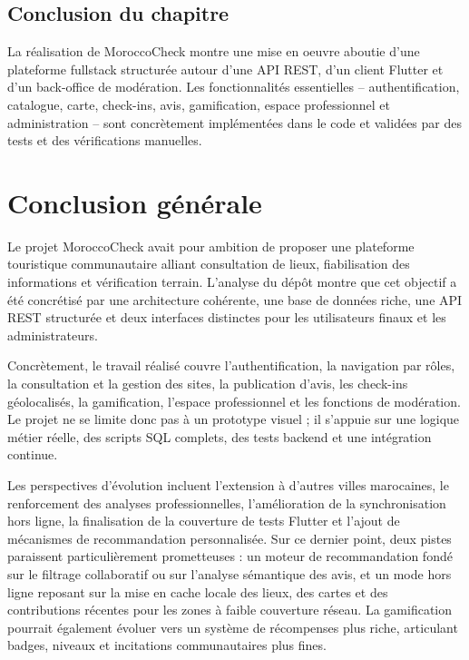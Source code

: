 ﻿\documentclass[12pt,a4paper]{report}
\begin{document}
\section{Conclusion du chapitre}
La r\'ealisation de MoroccoCheck montre une mise en oeuvre aboutie d'une plateforme fullstack structur\'ee autour d'une API REST, d'un client Flutter et d'un back-office de mod\'eration. Les fonctionnalit\'es essentielles -- authentification, catalogue, carte, check-ins, avis, gamification, espace professionnel et administration -- sont concr\`etement impl\'ement\'ees dans le code et valid\'ees par des tests et des v\'erifications manuelles.

\chapter*{Conclusion g\'en\'erale}
Le projet MoroccoCheck avait pour ambition de proposer une plateforme touristique communautaire alliant consultation de lieux, fiabilisation des informations et v\'erification terrain. L'analyse du d\'ep\^ot montre que cet objectif a \'et\'e concr\'etis\'e par une architecture coh\'erente, une base de donn\'ees riche, une API REST structur\'ee et deux interfaces distinctes pour les utilisateurs finaux et les administrateurs.

Concr\`etement, le travail r\'ealis\'e couvre l'authentification, la navigation par r\^oles, la consultation et la gestion des sites, la publication d'avis, les check-ins g\'eolocalis\'es, la gamification, l'espace professionnel et les fonctions de mod\'eration. Le projet ne se limite donc pas \`a un prototype visuel ; il s'appuie sur une logique m\'etier r\'eelle, des scripts SQL complets, des tests backend et une int\'egration continue.

Les perspectives d'\'evolution incluent l'extension \`a d'autres villes marocaines, le renforcement des analyses professionnelles, l'am\'elioration de la synchronisation hors ligne, la finalisation de la couverture de tests Flutter et l'ajout de m\'ecanismes de recommandation personnalis\'ee. Sur ce dernier point, deux pistes paraissent particuli\`erement prometteuses : un moteur de recommandation fond\'e sur le filtrage collaboratif ou sur l'analyse s\'emantique des avis, et un mode hors ligne reposant sur la mise en cache locale des lieux, des cartes et des contributions r\'ecentes pour les zones \`a faible couverture r\'eseau. La gamification pourrait \'egalement \'evoluer vers un syst\`eme de r\'ecompenses plus riche, articulant badges, niveaux et incitations communautaires plus fines.
\end{document}
